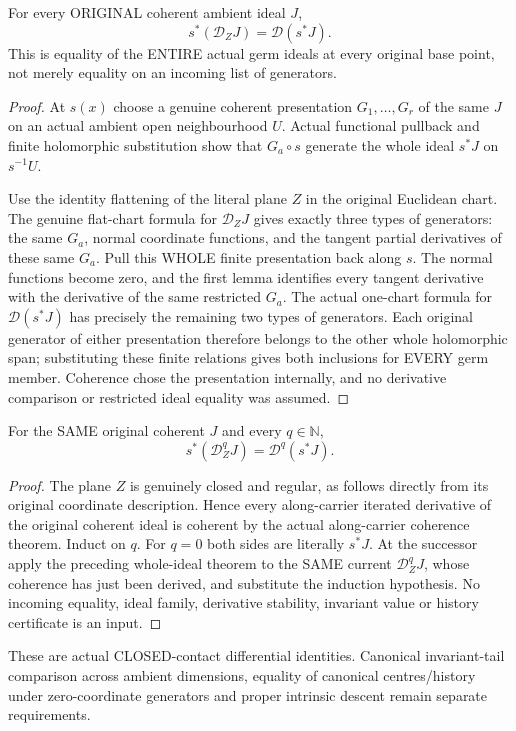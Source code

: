 \begin{theorem}
\label{hir:actual-zero-section-whole-derivative-ideal}
\leanok
For every ORIGINAL coherent ambient ideal $J$,
\[
 s^*(\mathcal D_Z J)=\mathcal D(s^*J).
\]
This is equality of the ENTIRE actual germ ideals at every original base point, not merely equality on an incoming list of generators.
\end{theorem}
\begin{proof}
At $s(x)$ choose a genuine coherent presentation $G_1,\ldots,G_r$ of the same $J$ on an actual ambient open neighbourhood $U$. Actual functional pullback and finite holomorphic substitution show that $G_a\circ s$ generate the whole ideal $s^*J$ on $s^{-1}U$.

Use the identity flattening of the literal plane $Z$ in the original Euclidean chart. The genuine flat-chart formula for $\mathcal D_ZJ$ gives exactly three types of generators: the same $G_a$, normal coordinate functions, and the tangent partial derivatives of these same $G_a$. Pull this WHOLE finite presentation back along $s$. The normal functions become zero, and the first lemma identifies every tangent derivative with the derivative of the same restricted $G_a$. The actual one-chart formula for $\mathcal D(s^*J)$ has precisely the remaining two types of generators. Each original generator of either presentation therefore belongs to the other whole holomorphic span; substituting these finite relations gives both inclusions for EVERY germ member. Coherence chose the presentation internally, and no derivative comparison or restricted ideal equality was assumed.
\end{proof}

\begin{theorem}
\label{hir:actual-zero-section-whole-iterated-derivative-ideal}
\leanok
For the SAME original coherent $J$ and every $q\in\mathbb N$,
\[
 s^*(\mathcal D_Z^q J)=\mathcal D^q(s^*J).
\]
\end{theorem}
\begin{proof}
The plane $Z$ is genuinely closed and regular, as follows directly from its original coordinate description. Hence every along-carrier iterated derivative of the original coherent ideal is coherent by the actual along-carrier coherence theorem. Induct on $q$. For $q=0$ both sides are literally $s^*J$. At the successor apply the preceding whole-ideal theorem to the SAME current $\mathcal D_Z^qJ$, whose coherence has just been derived, and substitute the induction hypothesis. No incoming equality, ideal family, derivative stability, invariant value or history certificate is an input.
\end{proof}

These are actual CLOSED-contact differential identities. Canonical invariant-tail comparison across ambient dimensions, equality of canonical centres/history under zero-coordinate generators and proper intrinsic descent remain separate requirements.
